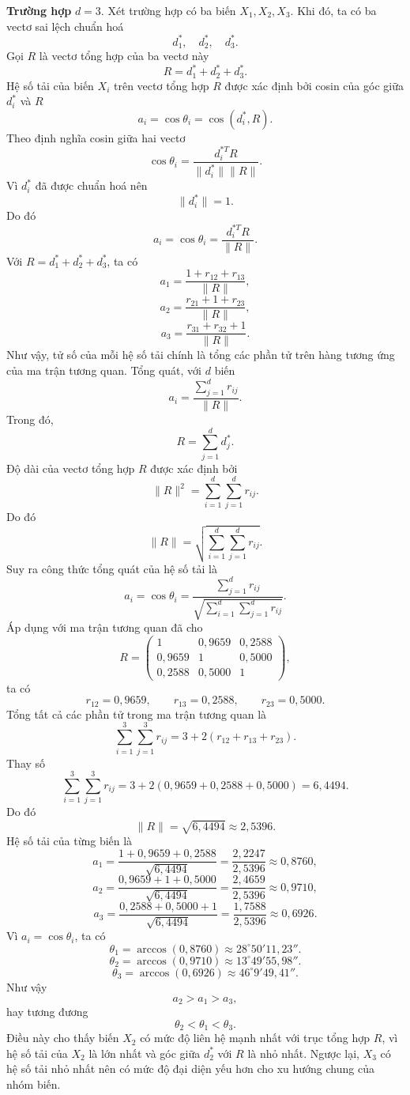 \textbf{Trường hợp} $d = 3$. Xét trường hợp có ba biến $X_1, X_2, X_3$. Khi đó, ta có ba vectơ sai lệch chuẩn hoá
\[
d_1^*, \quad d_2^*, \quad d_3^*.
\]
Gọi $R$ là vectơ tổng hợp của ba vectơ này
\[
R = d_1^* + d_2^* + d_3^*.
\]
Hệ số tải của biến $X_i$ trên vectơ tổng hợp $R$ được xác định bởi cosin của góc giữa $d_i^*$ và $R$
\[
a_i = \cos \theta_i = \cos(d_i^*, R).
\]
Theo định nghĩa cosin giữa hai vectơ
\[
\cos \theta_i = \frac{d_i^{*T} R}{\|d_i^*\| \|R\|}.
\]
Vì $d_i^*$ đã được chuẩn hoá nên
\[
\|d_i^*\| = 1.
\]
Do đó
\[
a_i = \cos \theta_i = \frac{d_i^{*T} R}{\|R\|}.
\]
Với $R = d_1^* + d_2^* + d_3^*$, ta có
\[
a_1 = \frac{1 + r_{12} + r_{13}}{\|R\|},
\]
\[
a_2 = \frac{r_{21} + 1 + r_{23}}{\|R\|},
\]
\[
a_3 = \frac{r_{31} + r_{32} + 1}{\|R\|}.
\]
Như vậy, tử số của mỗi hệ số tải chính là tổng các phần tử trên hàng tương ứng của ma trận tương quan. Tổng quát, với $d$ biến
\[
a_i = \frac{\sum_{j=1}^d r_{ij}}{\|R\|}.
\]
Trong đó,
\[
R = \sum_{j=1}^d d_j^*.
\]
Độ dài của vectơ tổng hợp $R$ được xác định bởi
\[
\|R\|^2 = \sum_{i=1}^d \sum_{j=1}^d r_{ij}.
\]
Do đó
\[
\|R\| = \sqrt{\sum_{i=1}^d \sum_{j=1}^d r_{ij}}.
\]
Suy ra công thức tổng quát của hệ số tải là
\[
\boxed{ a_i = \cos \theta_i = \frac{\sum_{j=1}^d r_{ij}}{\sqrt{\sum_{i=1}^d \sum_{j=1}^d r_{ij}}} }.
\]
Áp dụng với ma trận tương quan đã cho
\[
R = \begin{pmatrix}
	1 & 0,9659 & 0,2588 \\
	0,9659 & 1 & 0,5000 \\
	0,2588 & 0,5000 & 1
\end{pmatrix},
\]
ta có
\[
r_{12} = 0,9659, \qquad r_{13} = 0,2588, \qquad r_{23} = 0,5000.
\]
Tổng tất cả các phần tử trong ma trận tương quan là
\[
\sum_{i=1}^3 \sum_{j=1}^3 r_{ij} = 3 + 2(r_{12} + r_{13} + r_{23}).
\]
Thay số
\[
\sum_{i=1}^3 \sum_{j=1}^3 r_{ij} = 3 + 2(0,9659 + 0,2588 + 0,5000) = 6,4494.
\]
Do đó
\[
\|R\| = \sqrt{6,4494} \approx 2,5396.
\]
Hệ số tải của từng biến là
\[
a_1 = \frac{1 + 0,9659 + 0,2588}{\sqrt{6,4494}} = \frac{2,2247}{2,5396} \approx 0,8760,
\]
\[
a_2 = \frac{0,9659 + 1 + 0,5000}{\sqrt{6,4494}} = \frac{2,4659}{2,5396} \approx 0,9710,
\]
\[
a_3 = \frac{0,2588 + 0,5000 + 1}{\sqrt{6,4494}} = \frac{1,7588}{2,5396} \approx 0,6926.
\]
Vì $a_i = \cos \theta_i$, ta có
\[
\theta_1 = \arccos(0,8760) \approx 28^\circ 50' 11,23''.
\]
\[
\theta_2 = \arccos(0,9710) \approx 13^\circ 49' 55,98''.
\]
\[
\theta_3 = \arccos(0,6926) \approx 46^\circ 9' 49,41''.
\]
Như vậy
\[
a_2 > a_1 > a_3,
\]
hay tương đương
\[
\theta_2 < \theta_1 < \theta_3.
\]
Điều này cho thấy biến $X_2$ có mức độ liên hệ mạnh nhất với trục tổng hợp $R$, vì hệ số tải của $X_2$ là lớn nhất và góc giữa $d_2^*$ với $R$ là nhỏ nhất. Ngược lại, $X_3$ có hệ số tải nhỏ nhất nên có mức độ đại diện yếu hơn cho xu hướng chung của nhóm biến.
